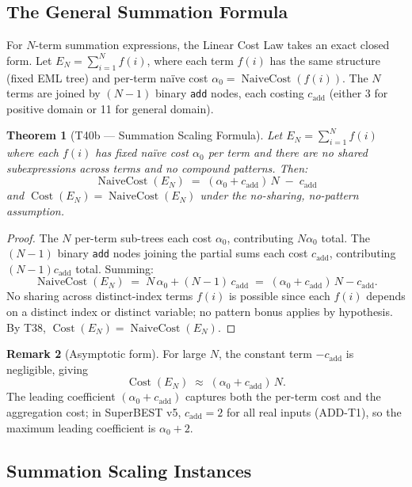 \documentclass[12pt,a4paper]{article}
\newtheorem{theorem}{Theorem}[section]
\theoremstyle{definition}
\newtheorem{remark}[theorem]{Remark}
\newcommand{\Cost}{\operatorname{Cost}}
\newcommand{\NC}{\operatorname{NaiveCost}}
\begin{document}
\subsection{The General Summation Formula}

For $N$-term summation expressions, the Linear Cost Law takes an exact
closed form.  Let $E_N = \sum_{i=1}^{N} f(i)$, where each term $f(i)$ has
the same structure (fixed EML tree) and per-term na\"{i}ve cost
$\alpha_0 = \NC(f(i))$.  The $N$ terms are joined by $(N-1)$ binary
\texttt{add} nodes, each costing $c_{\mathrm{add}}$ (either 3 for positive
domain or 11 for general domain).

\begin{theorem}[T40b --- Summation Scaling Formula]
\label{thm:T40b}
Let $E_N = \sum_{i=1}^{N} f(i)$ where each $f(i)$ has fixed na\"{i}ve
cost $\alpha_0$ per term and there are no shared subexpressions across terms
and no compound patterns.  Then:
\[
  \boxed{\NC(E_N) \;=\; (\alpha_0 + c_{\mathrm{add}})\,N \;-\; c_{\mathrm{add}}}
\]
and $\Cost(E_N) = \NC(E_N)$ under the no-sharing, no-pattern assumption.
\end{theorem}

\begin{proof}
The $N$ per-term sub-trees each cost $\alpha_0$, contributing $N \alpha_0$
total.  The $(N-1)$ binary \texttt{add} nodes joining the partial sums each
cost $c_{\mathrm{add}}$, contributing $(N-1) c_{\mathrm{add}}$ total.
Summing:
\[
  \NC(E_N) \;=\; N\,\alpha_0 + (N-1)\,c_{\mathrm{add}}
            \;=\; (\alpha_0 + c_{\mathrm{add}})\,N - c_{\mathrm{add}}.
\]
No sharing across distinct-index terms $f(i)$ is possible since each $f(i)$
depends on a distinct index or distinct variable; no pattern bonus applies
by hypothesis.  By T38, $\Cost(E_N) = \NC(E_N)$.
\end{proof}

\begin{remark}[Asymptotic form]
For large $N$, the constant term $-c_{\mathrm{add}}$ is negligible, giving
\[
  \Cost(E_N) \;\approx\; (\alpha_0 + c_{\mathrm{add}})\,N.
\]
The leading coefficient $(\alpha_0 + c_{\mathrm{add}})$ captures both the
per-term cost and the aggregation cost; in SuperBEST v5, $c_{\mathrm{add}} = 2$
for all real inputs (ADD-T1), so the maximum leading coefficient is $\alpha_0 + 2$.
\end{remark}

\subsection{Summation Scaling Instances}
\end{document}
